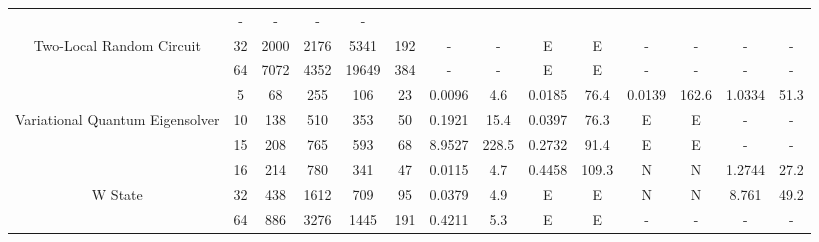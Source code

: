 \begin{table}[htb]
{\begin{tabular}{|c|c|c|c|c|c|c|c|c|c|c|c|c|c|}
 & - & -
 & - & -
 \\
Two-Local Random Circuit & 
32 & 2000 & 2176 & 5341 & 192
 & - & -
 & E & E
 & - & -
 & - & -
 \\
 & 
64 & 7072 & 4352 & 19649 & 384
 & - & -
 & E & E
 & - & -
 & - & -
 \\
\hline
 & 
5 & 68 & 255 & 106 & 23
 & 0.0096 & 4.6
 & 0.0185 & 76.4
 & 0.0139 & 162.6
 & 1.0334 & 51.3
 \\
Variational Quantum Eigensolver & 
10 & 138 & 510 & 353 & 50
 & 0.1921 & 15.4
 & 0.0397 & 76.3
 & E & E
 & - & -
 \\
 & 
15 & 208 & 765 & 593 & 68
 & 8.9527 & 228.5
 & 0.2732 & 91.4
 & E & E
 & - & -
 \\
\hline
 & 
16 & 214 & 780 & 341 & 47
 & 0.0115 & 4.7
 & 0.4458 & 109.3
 & N & N 
 & 1.2744 & 27.2
 \\
W State & 
32 & 438 & 1612 & 709 & 95
 & 0.0379 & 4.9
 & E & E
 & N & N 
 & 8.761 & 49.2
 \\
 & 
64 & 886 & 3276 & 1445 & 191
 & 0.4211 & 5.3
 & E & E
 & - & -
 & - & -
 \\
\hline
\end{tabular}}
\end{table}